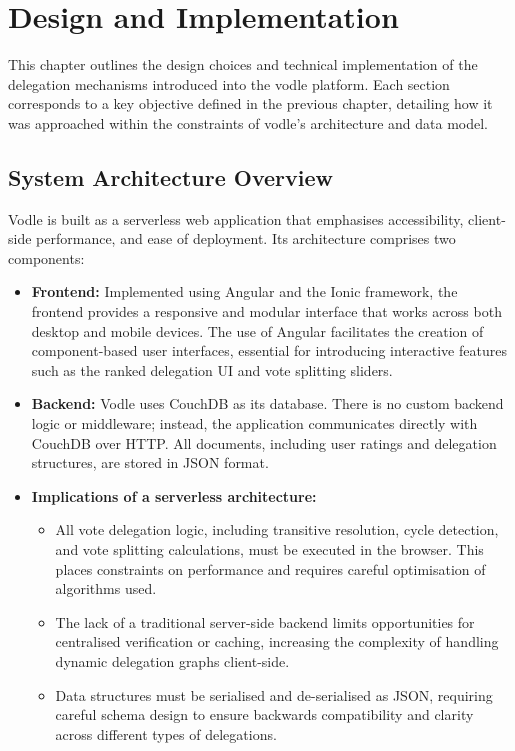 \chapter{Design and Implementation}
\label{ch:design_implementation}

This chapter outlines the design choices and technical implementation of the delegation mechanisms introduced into the vodle platform. Each section corresponds to a key objective defined in the previous chapter, detailing how it was approached within the constraints of vodle's architecture and data model.

\section{System Architecture Overview}
Vodle is built as a serverless web application that emphasises accessibility, client-side performance, and ease of deployment. Its architecture comprises two components:

\begin{itemize}
  \item \textbf{Frontend:} Implemented using Angular and the Ionic framework, the frontend provides a responsive and modular interface that works across both desktop and mobile devices. The use of Angular facilitates the creation of component-based user interfaces, essential for introducing interactive features such as the ranked delegation UI and vote splitting sliders.
  \item \textbf{Backend:} Vodle uses CouchDB as its database. There is no custom backend logic or middleware; instead, the application communicates directly with CouchDB over HTTP. All documents, including user ratings and delegation structures, are stored in JSON format.
  \item \textbf{Implications of a serverless architecture:}
  \begin{itemize}
    \item All vote delegation logic, including transitive resolution, cycle detection, and vote splitting calculations, must be executed in the browser. This places constraints on performance and requires careful optimisation of algorithms used.
    \item The lack of a traditional server-side backend limits opportunities for centralised verification or caching, increasing the complexity of handling dynamic delegation graphs client-side.
    \item Data structures must be serialised and de-serialised as JSON, requiring careful schema design to ensure backwards compatibility and clarity across different types of delegations.
  \end{itemize}
\end{itemize}


